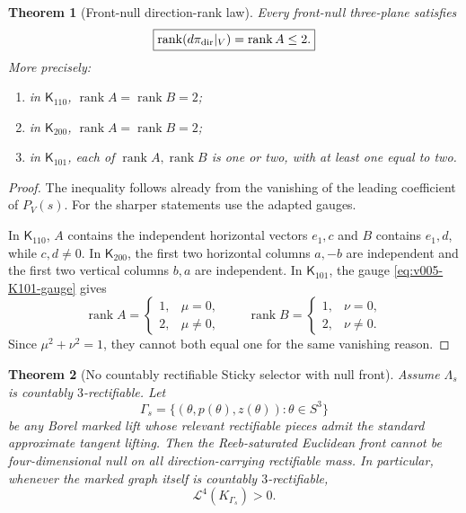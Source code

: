 \documentclass[10pt]{article}
\newtheorem{theorem}{Theorem}[section]
\newcommand{\rank}{\operatorname{rank}}
\begin{document}
\begin{theorem}[Front-null direction-rank law]
\label{thm:v005-direction-rank}
Every front-null three-plane satisfies
\begin{equation}
\label{eq:v005-direction-rank}
\boxed{
\rank(d\pi_{\rm dir}|_V)
=
\rank A
\le2.
}
\end{equation}
More precisely:
\begin{enumerate}[label=\textnormal{(\roman*)}]
\item in \(\mathsf K_{110}\), \(\rank A=\rank B=2\);
\item in \(\mathsf K_{200}\), \(\rank A=\rank B=2\);
\item in \(\mathsf K_{101}\), each of \(\rank A,\rank B\) is one or two, with at least one equal to
two.
\end{enumerate}
\end{theorem}

\begin{proof}
The inequality follows already from the vanishing of the leading coefficient of
\(P_V(s)\).  For the sharper statements use the adapted gauges.

In \(\mathsf K_{110}\), \(A\) contains the independent horizontal vectors \(e_1,c\) and \(B\)
contains \(e_1,d\), while \(c,d\neq0\).  In \(\mathsf K_{200}\), the first two horizontal columns
\(a,-b\) are independent and the first two vertical columns \(b,a\) are independent.  In
\(\mathsf K_{101}\), the gauge \eqref{eq:v005-K101-gauge} gives
\[
\rank A=
\begin{cases}
1,&\mu=0,\\
2,&\mu\neq0,
\end{cases}
\qquad
\rank B=
\begin{cases}
1,&\nu=0,\\
2,&\nu\neq0.
\end{cases}
\]
Since \(\mu^2+\nu^2=1\), they cannot both equal one for the same vanishing reason.
\end{proof}

\begin{theorem}[No countably rectifiable Sticky selector with null front]
\label{thm:v005-no-rectifiable-selector}
Assume \(\Lambda_s\) is countably \(3\)-rectifiable.  Let
\[
\Gamma_s
=
\{(\theta,p(\theta),z(\theta)):\theta\in S^3\}
\]
be any Borel marked lift whose relevant rectifiable pieces admit the standard approximate tangent
lifting.  Then the Reeb-saturated Euclidean front cannot be four-dimensional null on all
direction-carrying rectifiable mass.  In particular, whenever the marked graph itself is countably
\(3\)-rectifiable,
\begin{equation}
\label{eq:v005-positive-front-selector}
\boxed{
\mathcal L^4(K_{\Gamma_s})>0.
}
\end{equation}
\end{theorem}
\end{document}
